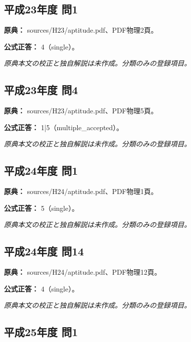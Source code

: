 \subsection{平成23年度 問1}
\label{q:h23-reg-apt-01}

\noindent\textbf{原典：} sources/H23/aptitude.pdf、PDF物理2頁。

\textbf{公式正答：} 4（single）。

\par\textit{原典本文の校正と独自解説は未作成。分類のみの登録項目。}

\subsection{平成23年度 問4}
\label{q:h23-reg-apt-04}

\noindent\textbf{原典：} sources/H23/aptitude.pdf、PDF物理5頁。

\textbf{公式正答：} 1|5（multiple\_accepted）。

\par\textit{原典本文の校正と独自解説は未作成。分類のみの登録項目。}

\subsection{平成24年度 問1}
\label{q:h24-reg-apt-01}

\noindent\textbf{原典：} sources/H24/aptitude.pdf、PDF物理1頁。

\textbf{公式正答：} 5（single）。

\par\textit{原典本文の校正と独自解説は未作成。分類のみの登録項目。}

\subsection{平成24年度 問14}
\label{q:h24-reg-apt-14}

\noindent\textbf{原典：} sources/H24/aptitude.pdf、PDF物理12頁。

\textbf{公式正答：} 4（single）。

\par\textit{原典本文の校正と独自解説は未作成。分類のみの登録項目。}

\subsection{平成25年度 問1}
\label{q:h25-reg-apt-01}

